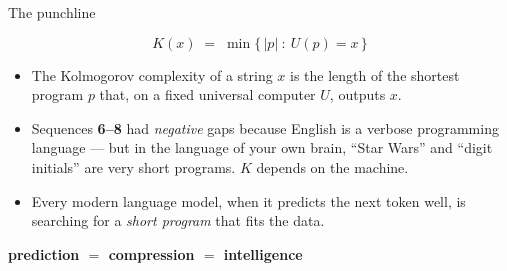 \documentclass[aspectratio=169, 12pt, xcolor={dvipsnames}]{beamer}
\begin{document}
\begin{frame}{The punchline}
\vfill
\begin{center}
\Large
\[
\boxed{\,K(x) \;=\; \min\{\,|p|\ :\ U(p) = x\,\}\,}
\]
\end{center}
\vfill
\small
\begin{itemize}
  \item The Kolmogorov complexity of a string $x$ is the length of the shortest program $p$ that, on a fixed universal computer $U$, outputs $x$.
  \item Sequences \textbf{6--8} had \emph{negative} gaps because English is a verbose programming language --- but in the language of your own brain, ``Star Wars'' and ``digit initials'' are very short programs. $K$ depends on the machine.
  \item Every modern language model, when it predicts the next token well, is searching for a \emph{short program} that fits the data.
\end{itemize}
\vfill
\begin{center}
\Large\textbf{prediction \;$=$\; compression \;$=$\; intelligence}
\end{center}
\end{frame}
\end{document}
